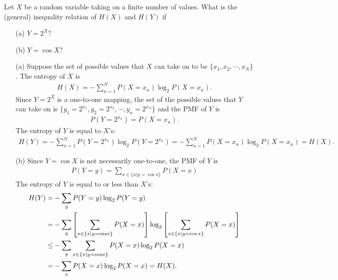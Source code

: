 \documentclass{assignment}
\begin{document}
\begin{prob}
    Let $X$ be a random variable taking on a finite number of values. What is the (general) inequality relation of $H(X)$ and $H(Y)$ if
    \begin{itemize}
        \item[(a)] $Y=2^X$?
        \item[(b)] $Y=\cos X$?
    \end{itemize}
\end{prob}
\begin{sol}
    \begin{itemize}
        \item[(a)] Suppose the set of possible values that $X$ can take on to be $\{x_1,x_2,\cdots,x_N\}$. The entropy of $X$ is
        \begin{align}
            H(X)=-\sum_{n=1}^NP(X=x_n)\log_2P(X=x_n).
        \end{align}
        Since $Y=2^X$ is a one-to-one mapping, the set of the possible values that $Y$ can take on is $\{y_1=2^{x_1},y_2=2^{x_2},\cdots,y_n=2^{x_N}\}$ and the PMF of $Y$ is
        \begin{align}
            P(Y=2^{x_n})=P(X=x_n).
        \end{align}
        The entropy of $Y$ is equal to $X$'s:
        \begin{align}
            H(Y)=-\sum_{n=1}^NP(Y=2^{x_n})\log_2P(Y=2^{x_n})=-\sum_{n=1}^NP(X=x_n)\log_2P(X=x_n)=H(X).
        \end{align}
        \item[(b)] Since $Y=\cos X$ is not necessarily one-to-one, the PMF of $Y$ is
        \begin{align}
            P(Y=y)=\sum_{x\in\{x\vert y=\cos x\}}P(X=x)
        \end{align}
        The entropy of $Y$ is equal to or less than $X$'s:
        \begin{align}
            \notag H(Y)=&-\sum_yP(Y=y)\log_2P(Y=y)\\
            \notag=&-\sum_y\left[\sum_{x\in\{x\vert y=cos x\}}P(X=x)\right]\log_2\left[\sum_{x\in\{x\vert y=\cos x\}} P(X=x)\right]\\
            \notag\leq&-\sum_y\sum_{x\in\{x\vert y=cos x\}}P(X=x)\log_2P(X=x)\\
            =&-\sum_xP(X=x)\log_2P(X=x)=H(X).
        \end{align}
    \end{itemize}
\end{sol}
\end{document}

